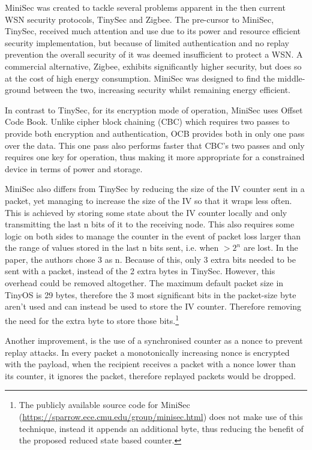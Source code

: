 MiniSec was created to tackle several problems apparent in the then current WSN security protocols, TinySec and Zigbee. The pre-cursor to MiniSec, TinySec, received much attention and use due to its power and resource efficient security implementation, but because of limited authentication and no replay prevention the overall security of it was deemed insufficient to protect a WSN. A commercial alternative, Zigbee, exhibits significantly higher security, but does so at the cost of high energy consumption. MiniSec was designed to find the middle-ground between the two, increasing security whilst remaining energy efficient. 

In contrast to TinySec, for its encryption mode of operation, MiniSec uses Offset Code Book. Unlike cipher block chaining (CBC) which requires two passes to provide both encryption and authentication, OCB provides both in only one pass over the data. This one pass also performs faster that CBC's two passes and only requires one key for operation, thus making it more appropriate for a constrained device in terms of power and storage. 

MiniSec also differs from TinySec by reducing the size of the IV counter sent in a packet, yet managing to increase the size of the IV so that it wraps less often. This is achieved by storing some state about the IV counter locally and only transmitting the last n bits of it to the receiving node. This also requires some logic on both sides to manage the counter in the event of packet loss larger than the range of values stored in the last n bits sent, i.e. when $>2^n$ are lost. In the paper, the authors chose 3 as n. Because of this, only 3 extra bits needed to be sent with a packet, instead of the 2 extra bytes in TinySec. However, this overhead could be removed altogether. The maximum default packet size in TinyOS is 29 bytes, therefore the 3 most significant bits in the packet-size byte aren't used and can instead be used to store the IV counter. Therefore removing the need for the extra byte to store those bits.\footnote{The publicly available source code for MiniSec (\url{https://sparrow.ece.cmu.edu/group/minisec.html}) does not make use of this technique, instead it appends an additional byte, thus reducing the benefit of the proposed reduced state based counter.}

Another improvement, is the use of a synchronised counter as a nonce to prevent replay attacks. In every packet a monotonically increasing nonce is encrypted with the payload, when the recipient receives a packet with a nonce lower than its counter, it ignores the packet, therefore replayed packets would be dropped. 
